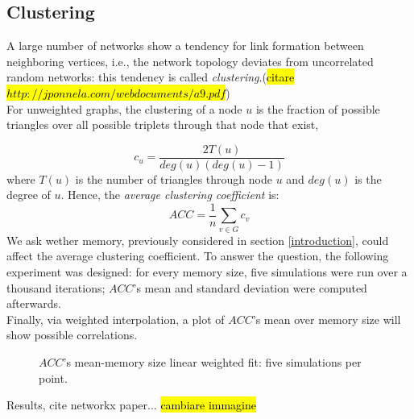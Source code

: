\subsection{Clustering} \label{clustering}
A large number of networks show a tendency for link formation between neighboring vertices, i.e., the network topology deviates from uncorrelated random networks: this tendency is called \textit{clustering}.(\hl{citare $http://jponnela.com/webdocuments/a9.pdf$}) \\
For unweighted graphs, the clustering of a node $u$ is the fraction of possible triangles over all possible triplets  through that node that exist,

\begin{equation}
\label{eq:clustering}
c_u = \frac{2 T(u)}{deg(u)(deg(u)-1)}
\end{equation}
where $T(u)$ is the number of triangles through node $u$ and $deg(u)$ is the degree of $u$.
Hence, the \textit{average clustering coefficient}  is:
\begin{equation}
\label{eq:average_clustering}
ACC = \frac{1}{n}\sum_{v \in G} c_v
\end{equation}
We ask wether memory, previously considered in section \ref{introduction}, could affect the average clustering coefficient.
To answer the question, the following experiment was designed:
for every memory size, five simulations were run over a thousand iterations; $ACC$'s mean and standard deviation were computed afterwards.\\
Finally, via weighted interpolation, a plot of $ACC$'s mean over memory size will show possible correlations.
\begin{figure}[h]
  \centering
  \def\svgwidth{\columnwidth}
  
  \caption{$ACC$'s mean-memory size linear weighted fit: five simulations per point.}
  \label{fig:clustering}
\end{figure}
Results, cite networkx paper...
\hl{cambiare immagine}